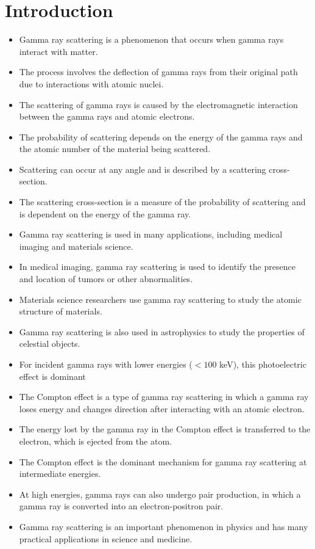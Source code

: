 \documentclass[a4paper,twocolumn]{IEEEtran}
\begin{document}
    \section{Introduction}
    \begin{itemize}
    \item Gamma ray scattering is a phenomenon that occurs when gamma rays interact with matter.
    \item The process involves the deflection of gamma rays from their original path due to interactions with atomic nuclei.
    \item The scattering of gamma rays is caused by the electromagnetic interaction between the gamma rays and atomic electrons.
    \item The probability of scattering depends on the energy of the gamma rays and the atomic number of the material being scattered.
    \item Scattering can occur at any angle and is described by a scattering cross-section.
    \item The scattering cross-section is a measure of the probability of scattering and is dependent on the energy of the gamma ray.
    \item Gamma ray scattering is used in many applications, including medical imaging and materials science.
    \item In medical imaging, gamma ray scattering is used to identify the presence and location of tumors or other abnormalities.
    \item Materials science researchers use gamma ray scattering to study the atomic structure of materials.
    \item Gamma ray scattering is also used in astrophysics to study the properties of celestial objects.
    \item For incident gamma rays with lower energies ($<100$ keV), this photoelectric effect is dominant~\cite{kane1986elastic,kane2005elastic}
    \item The Compton effect is a type of gamma ray scattering in which a gamma ray loses energy and changes direction after interacting with an atomic electron.
    \item The energy lost by the gamma ray in the Compton effect is transferred to the electron, which is ejected from the atom.
    \item The Compton effect is the dominant mechanism for gamma ray scattering at intermediate energies.
    \item At high energies, gamma rays can also undergo pair production, in which a gamma ray is converted into an electron-positron pair.
    \item Gamma ray scattering is an important phenomenon in physics and has many practical applications in science and medicine.
    \end{itemize}
        
\end{document}
